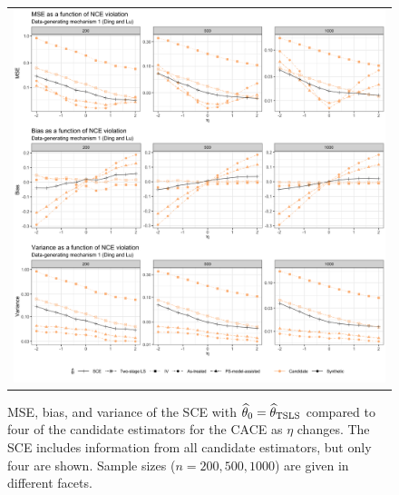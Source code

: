 \documentclass{article}
\def\stsls{_{\text{TSLS}}}
\begin{document}
\begin{figure}
\centering
\begin{tabular}{c}
\includegraphics[width =\textwidth]{figures/secondary-sim-mse-plot.png}
\end{tabular}\vspace{0.2in}
\caption{MSE, bias, and variance of the SCE with $\thetahat_0 = \thetahat\stsls$ compared to four of the candidate estimators for the CACE as $\eta$ changes. The SCE includes information from all candidate estimators, but only four are shown. Sample sizes ($n = 200, 500, 1000$) are given in different facets.}\label{sec-sim-pl}
\end{figure}
\end{document}
